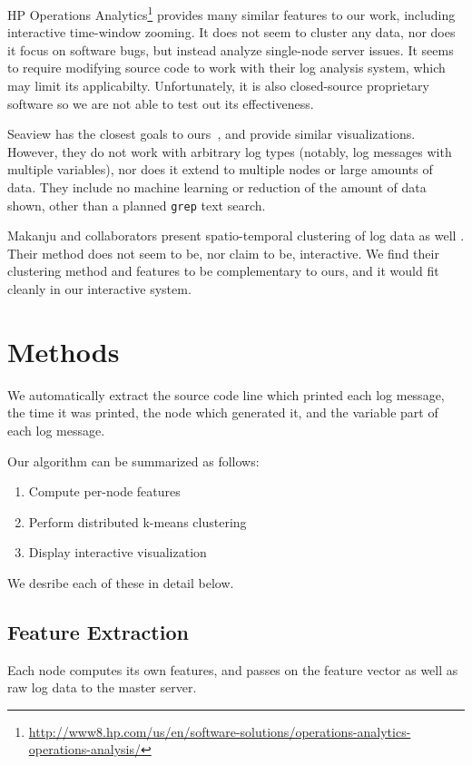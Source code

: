 \documentclass[conference]{style/acmsiggraph}
\begin{document}
HP Operations Analytics\footnote{\url{http://www8.hp.com/us/en/software-solutions/operations-analytics-operations-analysis/}} provides many similar features to our work, including interactive time-window zooming.
It does not seem to cluster any data, nor does it focus on software bugs, but instead analyze single-node server issues.
It seems to require modifying source code to work with their log analysis system, which may limit its applicabilty.
Unfortunately, it is also closed-source proprietary software so we are not able to test out its effectiveness.

Seaview has the closest goals to ours~\cite{hangalseaview}, and provide similar visualizations.
However, they do not work with arbitrary log types (notably, log messages with multiple variables), nor does it extend to multiple nodes or large amounts of data.
They include no machine learning or reduction of the amount of data shown, other than a planned \texttt{grep} text search.

Makanju and collaborators present spatio-temporal clustering of log data as well \cite{makanju2012spatio}.
Their method does not seem to be, nor claim to be, interactive.
We find their clustering method and features to be complementary to ours, and it would fit cleanly in our interactive system.

\section{Methods}

We automatically extract the source code line which printed each log message, the time it was printed, the node which generated it, and the variable part of each log message.

Our algorithm can be summarized as follows:

\begin{enumerate}
    \item Compute per-node features
    \item Perform distributed k-means clustering
    \item Display interactive visualization
\end{enumerate}

We desribe each of these in detail below.

\subsection{Feature Extraction}
Each node computes its own features, and passes on the feature vector as well as raw log data to the master server.
\end{document}
